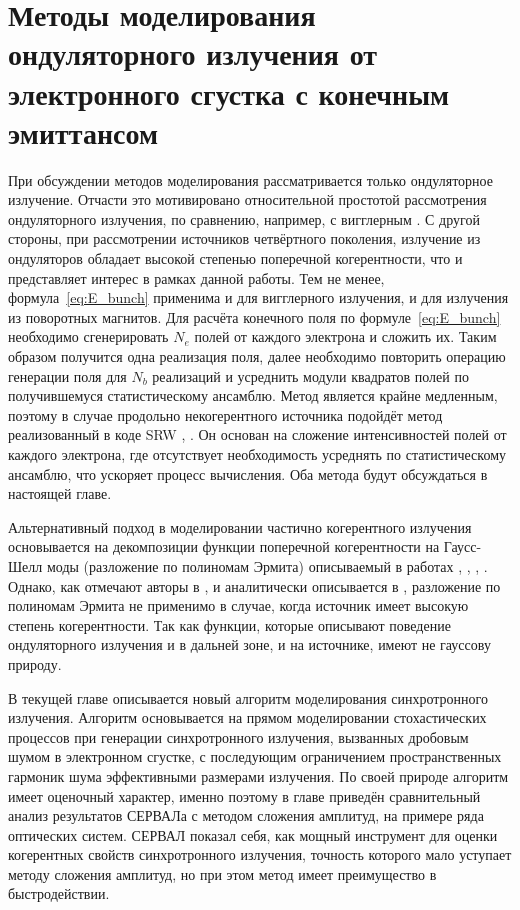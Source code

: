 
\chapter{Методы моделирования ондуляторного излучения от электронного сгустка с конечным эмиттансом} \label{chapt2}
При обсуждении методов моделирования рассматривается только ондуляторное излучение. Отчасти это мотивировано относительной простотой рассмотрения ондуляторного излучения, по сравнению, например, с вигглерным \cite{geloni_brightness_2014}. С другой стороны, при рассмотрении источников четвёртного поколения, излучение из ондуляторов обладает высокой степенью поперечной когерентности, что и представляет интерес в рамках данной работы. Тем не менее, формула~\ref{eq:E_bunch} применима и для вигглерного излучения, и для излучения из поворотных магнитов. Для расчёта конечного поля по формуле~\ref{eq:E_bunch} необходимо сгенерировать $N_e$ полей от каждого электрона и сложить их. Таким образом получится одна реализация поля, далее необходимо повторить операцию генерации поля для $N_b$ реализаций и усреднить модули квадратов полей по получившемуся статистическому ансамблю. Метод является крайне медленным, поэтому в случае продольно некогерентного источника подойдёт метод реализованный в коде SRW \cite{chubar_accurate_1998}, \cite{chubar_simulation_2006}. Он основан на сложение интенсивностей полей от каждого электрона, где отсутствует необходимость усреднять по статистическому ансамблю, что ускоряет процесс вычисления. Оба метода будут обсуждаться в настоящей главе. 

Альтернативный подход в моделировании частично когерентного излучения основывается на декомпозиции функции поперечной когерентности на Гаусс-Шелл моды (разложение по полиномам Эрмита) описываемый в работах \cite{singer_modelling_2011}, \cite{hua_application_2012}, \cite{khubbutdinov_coherence_2019}, \cite{noauthor_iucr_nodate}. Однако, как отмечают авторы в \cite{khubbutdinov_coherence_2019}, \cite{noauthor_iucr_nodate} и аналитически описывается в \cite{geloni_transverse_2008}, разложение по полиномам Эрмита не применимо в случае, когда источник имеет высокую степень когерентности. Так как функции, которые описывают поведение ондуляторного излучения и в дальней зоне, и на источнике, имеют не гауссову природу.

В текущей главе описывается новый алгоритм моделирования синхротронного излучения. Алгоритм основывается на прямом моделировании стохастических процессов при генерации синхротронного излучения, вызванных дробовым шумом в электронном сгустке, с последующим ограничением пространственных гармоник шума эффективными размерами излучения. По своей природе алгоритм имеет оценочный характер, именно поэтому в главе приведён сравнительный анализ результатов СЕРВАЛа с методом сложения амплитуд, на примере ряда оптических систем. СЕРВАЛ показал себя, как мощный инструмент для оценки когерентных свойств синхротронного излучения, точность которого мало уступает методу сложения амплитуд, но при этом метод имеет преимущество в быстродействии. 
